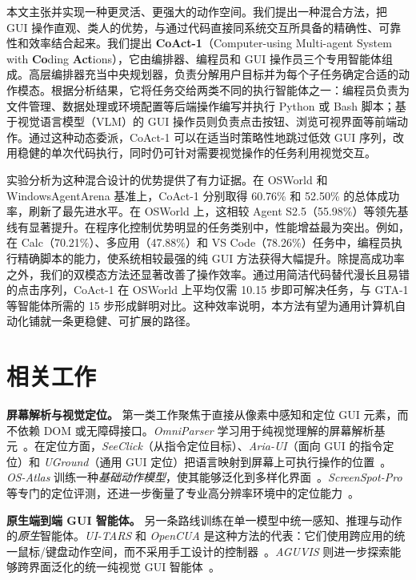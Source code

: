 \documentclass{article} %
\newcommand{\ours}{CoAct-1\xspace}
\begin{document}
本文主张并实现一种更灵活、更强大的动作空间。我们提出一种混合方法，把 GUI 操作直观、类人的优势，与通过代码直接同系统交互所具备的精确性、可靠性和效率结合起来。我们提出 \textbf{\ours}（Computer-using Multi-agent System with \textbf{Co}ding \textbf{Act}ions），它由编排器、编程员和 GUI 操作员三个专用智能体组成。高层编排器充当中央规划器，负责分解用户目标并为每个子任务确定合适的动作模态。根据分析结果，它将任务交给两类不同的执行智能体之一：编程员负责为文件管理、数据处理或环境配置等后端操作编写并执行 Python 或 Bash 脚本；基于视觉语言模型（VLM）的 GUI 操作员则负责点击按钮、浏览可视界面等前端动作。通过这种动态委派，\ours 可以在适当时策略性地跳过低效 GUI 序列，改用稳健的单次代码执行，同时仍可针对需要视觉操作的任务利用视觉交互。

实验分析为这种混合设计的优势提供了有力证据。在 OSWorld 和 WindowsAgentArena 基准上，\ours 分别取得 60.76\% 和 52.50\% 的总体成功率，刷新了最先进水平。在 OSWorld 上，这相较 Agent S2.5（55.98\%）等领先基线有显著提升。在程序化控制优势明显的任务类别中，性能增益最为突出。例如，在 Calc（70.21\%）、多应用（47.88\%）和 VS Code（78.26\%）任务中，编程员执行精确脚本的能力，使系统相较最强的纯 GUI 方法获得大幅提升。除提高成功率之外，我们的双模态方法还显著改善了操作效率。通过用简洁代码替代漫长且易错的点击序列，\ours 在 OSWorld 上平均仅需 10.15 步即可解决任务，与 GTA-1 等智能体所需的 15 步形成鲜明对比。这种效率说明，本方法有望为通用计算机自动化铺就一条更稳健、可扩展的路径。

\section{相关工作}
\label{sec:related-work}

\textbf{屏幕解析与视觉定位。} 第一类工作聚焦于直接从像素中感知和定位 GUI 元素，而不依赖 DOM 或无障碍接口。\textit{OmniParser} 学习用于纯视觉理解的屏幕解析基元~\citep{lu2024omniparser}。在定位方面，\textit{SeeClick}（从指令定位目标）、\textit{Aria-UI}（面向 GUI 的指令定位）和 \textit{UGround}（通用 GUI 定位）把语言映射到屏幕上可执行操作的位置~\citep{cheng2024seeclick,yang2024aria,gou2024uground}。\textit{OS-Atlas} 训练一种\emph{基础动作模型}，使其能够泛化到多样化界面~\citep{wu2024atlas}。\textit{ScreenSpot-Pro} 等专门的定位评测，还进一步衡量了专业高分辨率环境中的定位能力~\citep{li2025screenspotpro}。

\textbf{原生端到端 GUI 智能体。}
另一条路线训练在单一模型中统一感知、推理与动作的\emph{原生}智能体。\textit{UI-TARS} 和 \textit{OpenCUA} 是这种方法的代表：它们使用跨应用的统一鼠标/键盘动作空间，而不采用手工设计的控制器~\citep{qin2025ui, wang2025ui, wang2025opencua}。\textit{AGUVIS} 则进一步探索能够跨界面泛化的统一纯视觉 GUI 智能体~\citep{xu2024aguvis}。
\end{document}
